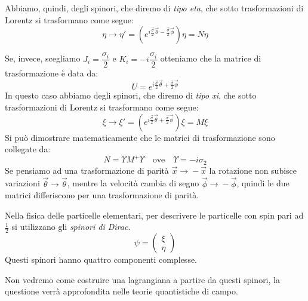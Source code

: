 Abbiamo, quindi, degli spinori, che diremo di \textit{tipo eta}, che sotto trasformazioni di Lorentz si trasformano come segue:
\begin{equation}
   \eta\xrightarrow{} \eta'=(e^{i \frac{\Vec{\sigma}}{2}\Vec{\theta}-\frac{\Vec{\sigma}}{2}\Vec{\phi}})\eta=N\eta
\end{equation}

Se, invece, scegliamo $J_i=\dfrac{\sigma_i}{2}$ e $K_i=-i\dfrac{\sigma_i}{2}$ otteniamo che la matrice di trasformazione è data da:
\begin{equation}
    U=e^{i \frac{\Vec{\sigma}}{2}\Vec{\theta}+\frac{\Vec{\sigma}}{2}\Vec{\phi}}
\end{equation}
In questo caso abbiamo degli spinori, che diremo di \textit{tipo xi}, che sotto trasformazioni di Lorentz si trasformano come segue:
\begin{equation}
   \xi\xrightarrow{} \xi'=(e^{i \frac{\Vec{\sigma}}{2}\Vec{\theta}+\frac{\Vec{\sigma}}{2}\Vec{\phi}})\xi=M\xi
\end{equation}
Si può dimostrare matematicamente che le matrici di trasformazione sono collegate da:
\begin{equation}
   N=\Upsilon M^+\Upsilon \quad \text{ove} \quad \Upsilon=-i\sigma_2
\end{equation}
Se pensiamo ad una trasformazione di parità $\Vec{x}\xrightarrow{}-\Vec{x}$ la rotazione non subisce variazioni $\Vec{\theta}\xrightarrow{}\Vec{\theta}$, mentre la velocità cambia di segno $\Vec{\phi}\xrightarrow{}-\Vec{\phi}$, quindi le due matrici differiscono per una trasformazione di parità.

Nella fisica delle particelle elementari, per descrivere le particelle con spin pari ad $\frac{1}{2}$ si utilizzano gli \textit{spinori di Dirac}. 
\begin{equation}
    \psi=\begin{pmatrix}
        \xi\\
        \eta
    \end{pmatrix}
\end{equation}
Questi spinori hanno quattro componenti complesse.

Non vedremo come costruire una lagrangiana a partire da questi spinori, la questione verrà approfondita nelle teorie quantistiche di campo.

